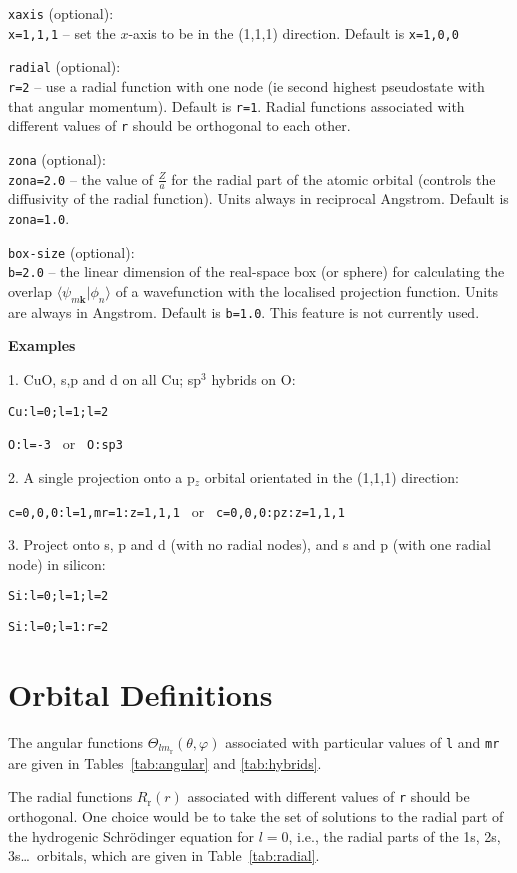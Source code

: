 \noindent
\verb#xaxis# (optional):\\
\verb#x=1,1,1#  --  set the $x$-axis to be in the (1,1,1) direction. Default is
\verb#x=1,0,0#

\noindent
\verb#radial# (optional):\\
\verb#r=2#      --  use a radial function with one node (ie second highest
pseudostate with that angular momentum). Default is
\verb#r=1#. Radial functions associated with different values of
\verb#r# should be orthogonal to each other. 

\noindent
\verb#zona# (optional):\\
\verb#zona=2.0# -- the value of $\frac{Z}{a}$ for the radial part of the
atomic orbital (controls the diffusivity of the radial
function). Units always in reciprocal Angstrom. Default is \verb#zona=1.0#.

\noindent
\verb#box-size# (optional):\\
\verb#b=2.0# -- the linear dimension of the real-space
box (or sphere) for calculating the overlap
$\langle\psi_{m\mathbf{k}}|\phi_{n}\rangle$ of a wavefunction with the 
localised projection function. Units are always in Angstrom. Default
is \verb#b=1.0#. This feature is not currently used.


\noindent
\textbf{Examples}

1. CuO, s,p and d on all Cu; sp$^3$ hybrids on O:

\verb#Cu:l=0;l=1;l=2 #

\verb#O:l=-3 #  or  \verb# O:sp3#

2. A single projection onto a p$_z$ orbital orientated in the (1,1,1)
 direction:

\verb#c=0,0,0:l=1,mr=1:z=1,1,1 # or \verb# c=0,0,0:pz:z=1,1,1#

3. Project onto s, p and d (with no radial nodes), and s and p (with one
   radial node) in silicon:

\verb#Si:l=0;l=1;l=2#

\verb#Si:l=0;l=1:r=2#


\section{Orbital Definitions} \label{sec:orbital-defs}

The angular functions $\Theta_{lm_{\mathrm{r}}}(\theta,\varphi)$
associated with particular values of \verb#l# and \verb#mr# are given
in Tables~\ref{tab:angular} and \ref{tab:hybrids}. 

The radial functions $R_{\mathrm{r}}(r)$ associated with different values of
\verb#r# should be orthogonal. One choice would be to take the set of
solutions to the radial part of the hydrogenic Schr\"{o}dinger
equation for $l=0$, i.e., the radial parts of the 1s,
2s, 3s\ldots\ orbitals, which are given in Table~\ref{tab:radial}. 


